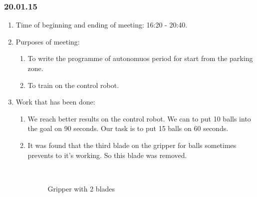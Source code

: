 \subsubsection{20.01.15}
\begin{enumerate}
	
	\item Time of beginning and ending of meeting: 16:20 - 20:40.
	
	\item Purposes of meeting: 
	\begin{enumerate}
		
		\item To write the programme of autonomuos period for start from the parking zone.
		
		\item To train on the control robot.
		
	\end{enumerate}

	\item Work that has been done:
	\begin{enumerate}
		
		\item We reach better results on the control robot. We can to put 10 balls into the goal on 90 seconds. Our task is to put 15 balls on 60 seconds.
		
		\item It was found that the third blade on the gripper for balls sometimes prevents to it's working. So this blade was removed.
        \begin{figure}[H]
	  	  \begin{minipage}[h]{0.2\linewidth}
	  	    \center  
	  	  \end{minipage}
	  	  \begin{minipage}[h]{0.6\linewidth}
	  		\caption{Gripper with 2 blades}
	  	  \end{minipage}
	   \end{figure}


\end{enumerate}
\end{enumerate}
